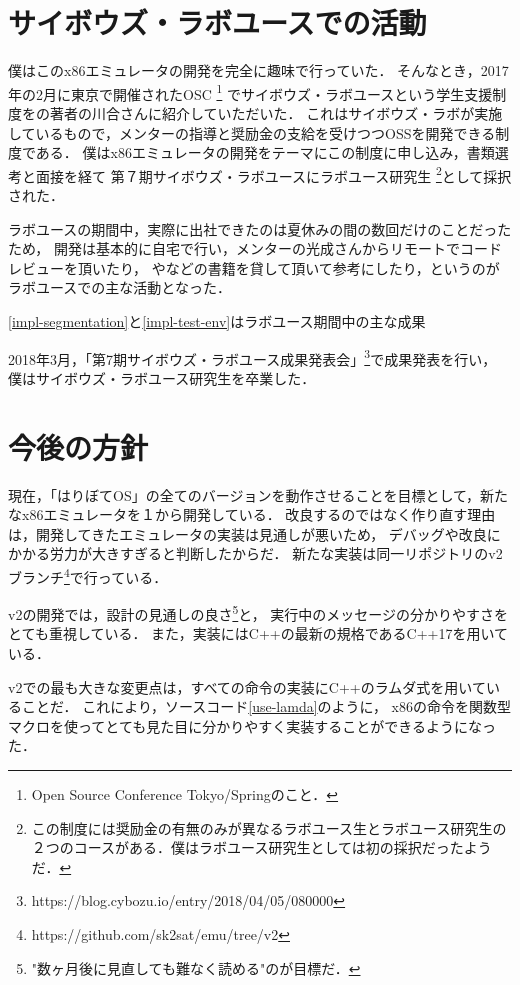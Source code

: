 \documentclass[10pt,a4j]{jsarticle}
\begin{document}
\section{サイボウズ・ラボユースでの活動}

僕はこのx86エミュレータの開発を完全に趣味で行っていた．
そんなとき，2017年の2月に東京で開催されたOSC
\footnote{Open Source Conference Tokyo/Springのこと．}
でサイボウズ・ラボユースという学生支援制度を\cite{30days-osdev}の著者の川合さんに紹介していただいた．
これはサイボウズ・ラボが実施しているもので，メンターの指導と奨励金の支給を受けつつOSSを開発できる制度である．
僕はx86エミュレータの開発をテーマにこの制度に申し込み，書類選考と面接を経て
第７期サイボウズ・ラボユースにラボユース研究生
\footnote{この制度には奨励金の有無のみが異なるラボユース生とラボユース研究生の２つのコースがある．僕はラボユース研究生としては初の採択だったようだ．}として採択された．

ラボユースの期間中，実際に出社できたのは夏休みの間の数回だけのことだったため，
開発は基本的に自宅で行い，メンターの光成さんからリモートでコードレビューを頂いたり，
\cite{read-486}や\cite{effective-cpp}などの書籍を貸して頂いて参考にしたり，というのがラボユースでの主な活動となった．

\ref{impl-segmentation}と\ref{impl-test-env}はラボユース期間中の主な成果

2018年3月，「第7期サイボウズ・ラボユース成果発表会」\footnote{https://blog.cybozu.io/entry/2018/04/05/080000}で成果発表を行い，
僕はサイボウズ・ラボユース研究生を卒業した．

\section{今後の方針}

現在，「はりぼてOS」の全てのバージョンを動作させることを目標として，新たなx86エミュレータを１から開発している．
改良するのではなく作り直す理由は，開発してきたエミュレータの実装は見通しが悪いため，
デバッグや改良にかかる労力が大きすぎると判断したからだ．
新たな実装は同一リポジトリのv2ブランチ\footnote{https://github.com/sk2sat/emu/tree/v2}で行っている．

v2の開発では，設計の見通しの良さ\footnote{"数ヶ月後に見直しても難なく読める"のが目標だ．}と，
実行中のメッセージの分かりやすさをとても重視している．
また，実装にはC++の最新の規格であるC++17を用いている．

v2での最も大きな変更点は，すべての命令の実装にC++のラムダ式を用いていることだ．
これにより，ソースコード\ref{use-lamda}のように，
x86の命令を関数型マクロを使ってとても見た目に分かりやすく実装することができるようになった．
\end{document}
